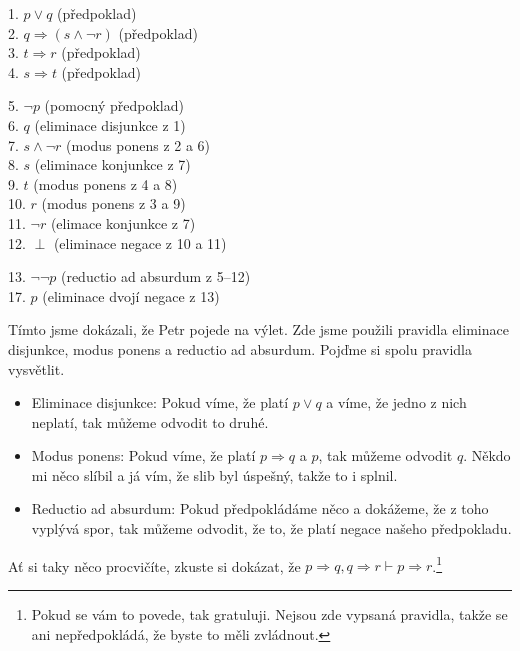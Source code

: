 \begin{example}
  \begin{proofbox}
    1. $p \lor q$ (předpoklad) \\
    2. $q \Rightarrow (s \land \neg r)$ (předpoklad) \\
    3. $t \Rightarrow r$ (předpoklad) \\
    4. $s \Rightarrow t$ (předpoklad) 
  \begin{proofbox}
    5. $\neg p$ (pomocný předpoklad) \\
    6. $q$ (eliminace disjunkce z 1) \\
    7. $s \land \neg r$ (modus ponens z 2 a 6) \\
    8. $s$ (eliminace konjunkce z 7) \\
    9. $t$ (modus ponens z 4 a 8) \\
    10. $r$ (modus ponens z 3 a 9) \\
    11. $\neg r$ (elimace konjunkce z 7) \\
    12. $\perp$ (eliminace negace z 10 a 11)
  \end{proofbox}
    13. $\lnot\lnot p$ (reductio ad absurdum z 5--12) \\
    17. $p$ (eliminace dvojí negace z 13)
  \end{proofbox}
  Tímto jsme dokázali, že Petr pojede na výlet. Zde jsme použili pravidla eliminace disjunkce, modus ponens a reductio ad absurdum. Pojďme si spolu pravidla vysvětlit. 
  \begin{itemize}
    \item Eliminace disjunkce: Pokud víme, že platí $p \lor q$ a víme, že jedno z nich neplatí, tak můžeme odvodit to druhé. 
    \item Modus ponens: Pokud víme, že platí $p \Rightarrow q$ a $p$, tak můžeme odvodit $q$. Někdo mi něco slíbil a já vím, že slib byl úspešný, takže to i splnil.
    \item Reductio ad absurdum: Pokud předpokládáme něco a dokážeme, že z toho vyplývá spor, tak můžeme odvodit, že to, že platí negace našeho předpokladu.
  \end{itemize}
\end{example}

\begin{problem}
  Ať si taky něco procvičíte, zkuste si dokázat, že $p \Rightarrow q, q \Rightarrow r \vdash p \Rightarrow r$.\footnote{Pokud se vám to povede, tak gratuluji. Nejsou zde vypsaná pravidla, takže se ani nepředpokládá, že byste to měli zvládnout.}
\end{problem}

